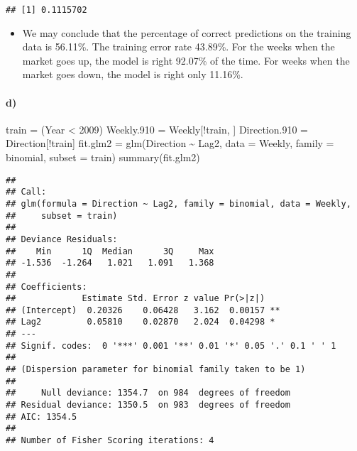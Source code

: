 \documentclass[
]{article}
\newenvironment{Shaded}{\begin{snugshade}}{\end{snugshade}}
\newcommand{\AttributeTok}[1]{\textcolor[rgb]{0.77,0.63,0.00}{#1}}
\newcommand{\DecValTok}[1]{\textcolor[rgb]{0.00,0.00,0.81}{#1}}
\newcommand{\FloatTok}[1]{\textcolor[rgb]{0.00,0.00,0.81}{#1}}
\newcommand{\FunctionTok}[1]{\textcolor[rgb]{0.00,0.00,0.00}{#1}}
\newcommand{\NormalTok}[1]{#1}
\newcommand{\OtherTok}[1]{\textcolor[rgb]{0.56,0.35,0.01}{#1}}
\newcommand{\SpecialCharTok}[1]{\textcolor[rgb]{0.00,0.00,0.00}{#1}}
\providecommand{\tightlist}{%
  \setlength{\itemsep}{0pt}\setlength{\parskip}{0pt}}
\begin{document}
\begin{verbatim}
## [1] 0.1115702
\end{verbatim}

\begin{itemize}
\tightlist
\item
  We may conclude that the percentage of correct predictions on the
  training data is 56.11\%. The training error rate 43.89\%. For the
  weeks when the market goes up, the model is right 92.07\% of the time.
  For weeks when the market goes down, the model is right only 11.16\%.
\end{itemize}

\hypertarget{d}{%
\paragraph{d)}\label{d}}

\begin{Shaded}
\begin{Highlighting}[]
\NormalTok{train }\OtherTok{=}\NormalTok{ (Year }\SpecialCharTok{\textless{}} \DecValTok{2009}\NormalTok{)}
\NormalTok{Weekly}\FloatTok{.910} \OtherTok{=}\NormalTok{ Weekly[}\SpecialCharTok{!}\NormalTok{train, ]}
\NormalTok{Direction}\FloatTok{.910} \OtherTok{=}\NormalTok{ Direction[}\SpecialCharTok{!}\NormalTok{train]}
\NormalTok{fit.glm2 }\OtherTok{=} \FunctionTok{glm}\NormalTok{(Direction }\SpecialCharTok{\textasciitilde{}}\NormalTok{ Lag2, }\AttributeTok{data =}\NormalTok{ Weekly, }\AttributeTok{family =}\NormalTok{ binomial, }\AttributeTok{subset =}\NormalTok{ train)}
\FunctionTok{summary}\NormalTok{(fit.glm2)}
\end{Highlighting}
\end{Shaded}

\begin{verbatim}
## 
## Call:
## glm(formula = Direction ~ Lag2, family = binomial, data = Weekly, 
##     subset = train)
## 
## Deviance Residuals: 
##    Min      1Q  Median      3Q     Max  
## -1.536  -1.264   1.021   1.091   1.368  
## 
## Coefficients:
##             Estimate Std. Error z value Pr(>|z|)   
## (Intercept)  0.20326    0.06428   3.162  0.00157 **
## Lag2         0.05810    0.02870   2.024  0.04298 * 
## ---
## Signif. codes:  0 '***' 0.001 '**' 0.01 '*' 0.05 '.' 0.1 ' ' 1
## 
## (Dispersion parameter for binomial family taken to be 1)
## 
##     Null deviance: 1354.7  on 984  degrees of freedom
## Residual deviance: 1350.5  on 983  degrees of freedom
## AIC: 1354.5
## 
## Number of Fisher Scoring iterations: 4
\end{verbatim}
\end{document}
